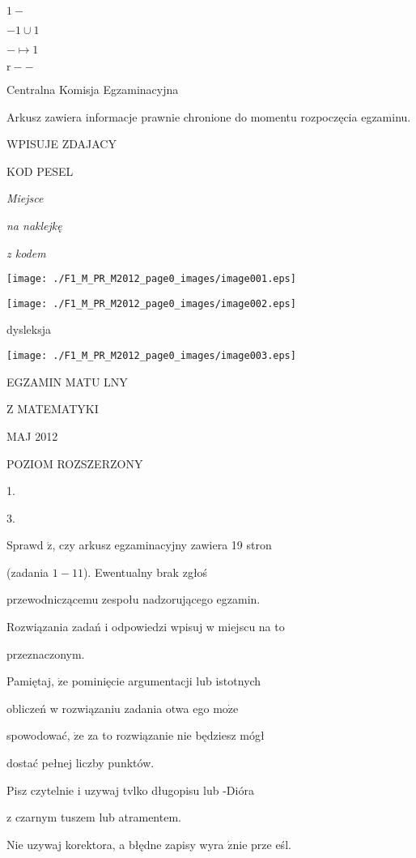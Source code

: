 \documentclass[a4paper,12pt]{article}
\begin{document}
$1-$

$-1\cup 1$

$-\mapsto 1$

$\mathrm{r}--$

Centralna Komisja Egzaminacyjna

Arkusz zawiera informacje prawnie chronione do momentu rozpoczęcia egzaminu.

WPISUJE ZDAJACY

KOD PESEL

{\it Miejsce}

{\it na naklejkę}

{\it z kodem}
\begin{center}
\texttt{[image: ./F1\_M\_PR\_M2012\_page0\_images/image001.eps]}

\texttt{[image: ./F1\_M\_PR\_M2012\_page0\_images/image002.eps]}
\end{center}
\fbox{} dysleksja
\begin{center}
\texttt{[image: ./F1\_M\_PR\_M2012\_page0\_images/image003.eps]}
\end{center}
EGZAMIN MATU LNY

Z MATEMATYKI

MAJ 2012

POZIOM ROZSZERZONY

1.

3.

Sprawd $\acute{\mathrm{z}}$, czy arkusz egzaminacyjny zawiera 19 stron

(zadania $1-11$). Ewentualny brak zgłoś

przewodniczącemu zespołu nadzorującego egzamin.

Rozwiązania zadań i odpowiedzi wpisuj w miejscu na to

przeznaczonym.

Pamiętaj, $\dot{\mathrm{z}}\mathrm{e}$ pominięcie argumentacji lub istotnych

obliczeń w rozwiązaniu zadania otwa ego $\mathrm{m}\mathrm{o}\dot{\mathrm{z}}\mathrm{e}$

spowodować, $\dot{\mathrm{z}}\mathrm{e}$ za to rozwiązanie nie będziesz mógł

dostać pełnej liczby punktów.

Pisz czytelnie i uzywaj tvlko długopisu lub -Dióra

z czarnym tuszem lub atramentem.

Nie uzywaj korektora, a błędne zapisy wyra $\acute{\mathrm{z}}\mathrm{n}\mathrm{i}\mathrm{e}$ prze eśl.
\end{document}
